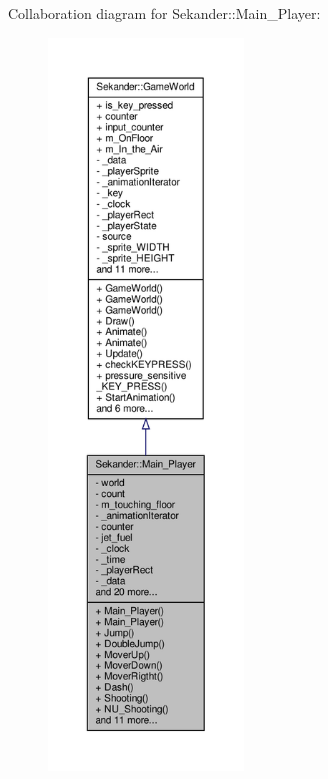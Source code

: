 Collaboration diagram for Sekander\+:\+:Main\+\_\+\+Player\+:
\nopagebreak
\begin{figure}[H]
\begin{center}
\leavevmode
\includegraphics[height=550pt]{classSekander_1_1Main__Player__coll__graph}
\end{center}
\end{figure}

